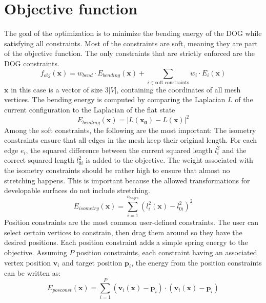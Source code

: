 \documentclass[a4paper,twoside,12pt,nochapterprefix]{scrbook}
\begin{document}
\section{Objective function}\label{sec:objective}
The goal of the optimization is to minimize the bending energy of the DOG while satisfying all constraints. Most of the constraints are soft, meaning they are part of the objective function. The only constraints that are strictly enforced are the DOG constraints.
\begin{equation}
f_{obj}(\mathbf{x}) = w_{bend} \cdot E_{bending}(\mathbf{x}) + \sum_{i \in \mbox{soft constraints}} w_i \cdot E_i(\mathbf{x})
\end{equation}
$\mathbf{x}$ in this case is a vector of size $3|V|$, containing the coordinates of all mesh vertices.\newline
The bending energy is computed by comparing the Laplacian $L$ of the current configuration to the Laplacian of the flat state
\begin{equation}
E_{bending}(\mathbf{x}) = |L(\mathbf{x_0}) - L(\mathbf{x})|^2
\end{equation}
Among the soft constraints, the following are the most important:\newline
The isometry constraints ensure that all edges in the mesh keep their original length. For each edge $e_i$, the squared difference between the current squared length $l_i^2$ and the correct squared length $l_{0i}^2$ is added to the objective. The weight associated with the isometry constraints should be rather high to ensure that almost no stretching happens. This is important because the allowed transformations for developable surfaces do not include stretching.
\begin{equation}
E_{isometry}(\mathbf{x}) = \sum_{i = 1}^{n_{edges}} (l_i^2(\mathbf{x}) - l_{0i}^2)^2
\end{equation}
Position constraints are the most common user-defined constraints. The user can select certain vertices to constrain, then drag them around so they have the desired positions. Each position constraint adds a simple spring energy to the objective. Assuming $P$ position constraints, each constraint having an associated vertex position $\mathbf{v}_i$ and target position $\mathbf{p}_i$, the energy from the position constraints can be written as:
\begin{equation}
E_{posconst}(\mathbf{x}) = \sum_{i = 1}^P (\mathbf{v}_i(\mathbf{x}) - \mathbf{p}_i) \cdot (\mathbf{v}_i(\mathbf{x}) - \mathbf{p}_i)
\end{equation}
\end{document}
